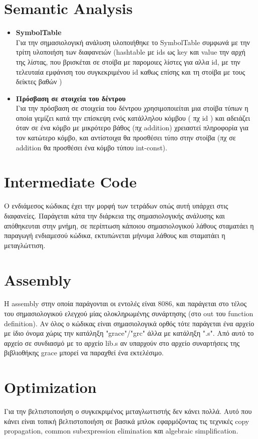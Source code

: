 \documentclass[12pt]{article}
\begin{document}
\section*{Semantic Analysis}
\begin{itemize}
\item\textbf{SymbolTable}\\
Για την σημασιολογική ανάλυση υλοποιήθηκε το SymbolTable συμφωνά με την τρίτη υλοποιήση των 
διαφανειών (hashtable με ids ως key και value την αρχή της λίστας, που βρισκέται σε στοίβα με παρομοιες λίστες για αλλα id, με την τελευταία εμφάνιση του συγκεκριμένου id καθως επίσης και τη στοίβα με τους δείκτες βαθών ) 
\item\textbf{Πρόσβαση σε στοιχεία του δέντρου}\\
Για την πρόσβαση σε στοιχεία του δέντρου χρησιμοποιείται μια στοίβα τύπων η οποία γεμίζει κατά την επίσκεψη ενός κατάλληλου κόμβου ( πχ id ) και αδειάζει όταν σε ένα κόμβο με μικρότερο βάθος (πχ addition) χρειαστεί πληροφορία για τον κατώτερο κόμβο, και αντίστοιχα θα προσθέσει τύπο στην στοίβα (πχ σε addition θα προσθέσει ένα κόμβο τύπου int-const).
\end{itemize}

\section*{Intermediate Code}
Ο ενδιάμεσος κώδικας έχει την μορφή των τετράδων οπώς αυτή υπάρχει στις διαφανείες. Παράγεται κάτα την διάρκεια της σημασιολογικής ανάλυσης και απόθηκευται στην μνήμη, σε περίπτωση κάποιου σημασιολογικού λάθους σταματάει η παραγωγή ενδιαμεσού κώδικα, εκτυπώνεται μήνυμα λάθους και σταματάει η μεταγλώττιση.

\section*{Assembly}
Η assembly στην οποία παράγονται οι εντολές είναι 8086, και παράγεται στο τέλος του σημασιολογικού ελεγχού μίας ολοκληρωμένης συνάρτησης (στο out του function definition). Αν όλος ο κώδικας είναι σημασιολογικά ορθός τότε παράγεται ένα αρχείο με ίδιο όνομα χώρις την κατάληξη "grace"/"grc" άλλα με κατάληξη ".s". Από αυτό το αρχείο σε συνδιασμό με το αρχείο lib.s αν υπαρχούν στο αρχείο συναρτήσεις της βιβλιοθήκης grace μπορεί να παραχθεί ένα εκτελέσιμο.

\section*{Optimization}
Για την βελτιστοποιήση ο συγκεκριμένος μεταγλωττιστής δεν κάνει πολλά. Αυτό που κάνει είναι τοπική βελτιστοποιήση σε βασικά μπλοκ εφαρμόζοντας τις τεχνικές copy propagation, common subexpression elimination και algebraic simplification.
\end{document}
